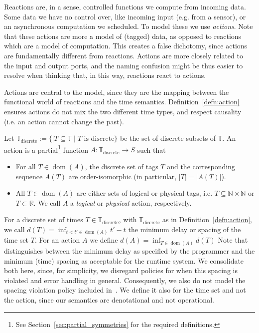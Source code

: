 Reactions are, in a sense, controlled functions we compute from incoming data. 
Some data we have no control over, like incoming input (e.g. from a sensor), or an asynchronous computation we scheduled.
To model these we use \emph{actions}.
Note that these actions are more a model of (tagged) data, as opposed to reactions which are a model of computation.
This creates a false dichotomy, since actions are fundamentally different from reactions.
Actions are more closely related to the input and output ports, and the naming confusion might be thus easier to resolve when thinking that, in this way, reactions react to actions.

Actions are central to the model, since they are the mapping between the functional world of reactions and the time semantics. 
Definition~\ref{defn:action} ensures actions do not mix the two different time types, and respect causality (i.e. an action cannot change the past).

\begin{defn}
    \label{defn:action}
Let $\mathbb{T}_\text{discrete} := \{ \mid T \subseteq \mathbb{T} \mid T \text{ is discrete}  \}$ be the set of discrete subsets of $\mathbb{T}$.
An action is a partial\footnote{See Section~\ref{sec:partial_symmetries} for the required definitions.} function $A : \mathbb{T}_\text{discrete} \rightarrow S$ such that
\begin{itemize}
    \item For all $T \in \operatorname{dom}(A)$, the discrete set of tags $T$ and the corresponding sequence $A(T)$ are order-isomorphic (in particular, $|T| = |A(T)|$).
    \item All $T \in \operatorname{dom}(A)$ are either sets of logical or physical tags, i.e. $T \subseteq \mathbb{N} \times \mathbb{N}$ or $T  \subset \mathbb{R}$. We call $A$ a \emph{logical} or \emph{physical} action, respectively.
\end{itemize}
\end{defn}

For a discrete set of times $T \in \mathbb{T}_\text{discrete}$, with $\mathbb{T}_\text{discrete}$ as in Definition~\ref{defn:action}, we call $d(T) = \operatorname{inf}_{t < t' \in \operatorname{dom}(A)} t' - t$ the minimum delay or spacing of the time set $T$. 
For an action $A$ we define $d(A) = \operatorname{inf}_{T \in \operatorname{dom}(A)} d(T)$
Note that~\cite{lohstroh_phdthesis} distinguishes between the minimum delay as specified by the programmer and the minimum (time) spacing as acceptable for the runtime system.
We consolidate both here, since, for simplicity, we disregard policies for when this spacing is violated and error handling in general.
Consequently, we also do not model the spacing violation policy included in~\cite{lohstroh_phdthesis}. 
We define it also for the time set and not the action, since our semantics are denotational and not operational.

